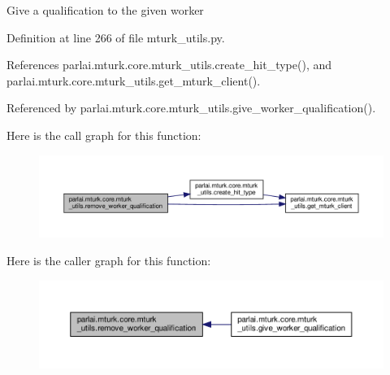 \begin{DoxyVerb}Give a qualification to the given worker\end{DoxyVerb}
 

Definition at line 266 of file mturk\+\_\+utils.\+py.



References parlai.\+mturk.\+core.\+mturk\+\_\+utils.\+create\+\_\+hit\+\_\+type(), and parlai.\+mturk.\+core.\+mturk\+\_\+utils.\+get\+\_\+mturk\+\_\+client().



Referenced by parlai.\+mturk.\+core.\+mturk\+\_\+utils.\+give\+\_\+worker\+\_\+qualification().

Here is the call graph for this function\+:
\nopagebreak
\begin{figure}[H]
\begin{center}
\leavevmode
\includegraphics[width=350pt]{namespaceparlai_1_1mturk_1_1core_1_1mturk__utils_a9221bb896f04cca6c0acac4bc127fdbf_cgraph}
\end{center}
\end{figure}
Here is the caller graph for this function\+:
\nopagebreak
\begin{figure}[H]
\begin{center}
\leavevmode
\includegraphics[width=350pt]{namespaceparlai_1_1mturk_1_1core_1_1mturk__utils_a9221bb896f04cca6c0acac4bc127fdbf_icgraph}
\end{center}
\end{figure}
\mbox{\label{namespaceparlai_1_1mturk_1_1core_1_1mturk__utils_a03b8f25675cb76e8b27205ca5d26e623}} 
